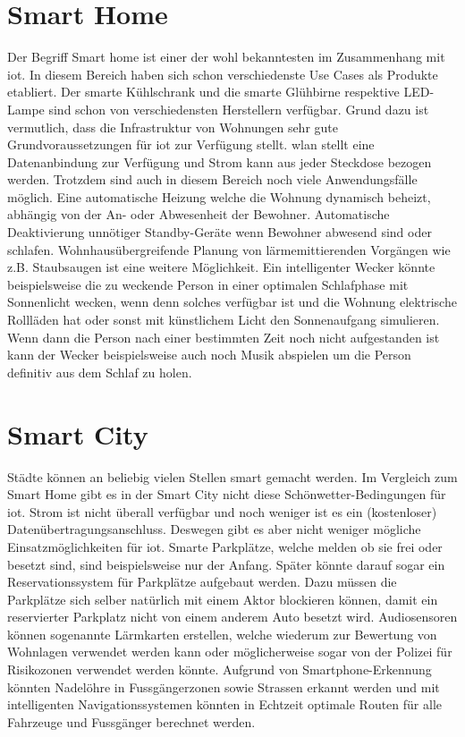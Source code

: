 \section{Smart Home}
Der Begriff \glqq{}Smart home\grqq{} ist einer der wohl bekanntesten im Zusammenhang mit \gls{iot}. In diesem Bereich haben sich schon verschiedenste Use Cases als Produkte etabliert. Der smarte Kühlschrank und die smarte Glühbirne respektive LED-Lampe sind schon von verschiedensten Herstellern verfügbar. Grund dazu ist vermutlich, dass die Infrastruktur von Wohnungen sehr gute Grundvoraussetzungen für \gls{iot} zur Verfügung stellt. \gls{wlan} stellt eine Datenanbindung zur Verfügung und Strom kann aus jeder Steckdose bezogen werden. Trotzdem sind auch in diesem Bereich noch viele Anwendungsfälle möglich. Eine automatische Heizung welche die Wohnung dynamisch beheizt, abhängig von der An- oder Abwesenheit der Bewohner. Automatische Deaktivierung unnötiger Standby-Geräte wenn Bewohner abwesend sind oder schlafen. Wohnhausübergreifende Planung von lärmemittierenden Vorgängen wie z.B. Staubsaugen ist eine weitere Möglichkeit. Ein intelligenter Wecker könnte beispielsweise die zu weckende Person in einer optimalen Schlafphase mit Sonnenlicht wecken, wenn denn solches verfügbar ist und die Wohnung elektrische Rollläden hat oder sonst mit künstlichem Licht den Sonnenaufgang simulieren. Wenn dann die Person nach einer bestimmten Zeit noch nicht aufgestanden ist kann der Wecker beispielsweise auch noch Musik abspielen um die Person definitiv aus dem Schlaf zu holen.

\section{Smart City}
Städte können an beliebig vielen Stellen \glqq{}smart\grqq{} gemacht werden. Im Vergleich zum Smart Home gibt es in der Smart City nicht diese Schönwetter-Bedingungen für \gls{iot}. Strom ist nicht überall verfügbar und noch weniger ist es ein (kostenloser) Datenübertragungsanschluss. Deswegen gibt es aber nicht weniger mögliche Einsatzmöglichkeiten für \gls{iot}. Smarte Parkplätze, welche melden ob sie frei oder besetzt sind, sind beispielsweise nur der Anfang. Später könnte darauf sogar ein Reservationssystem für Parkplätze aufgebaut werden. Dazu müssen die Parkplätze sich selber natürlich mit einem Aktor blockieren können, damit ein reservierter Parkplatz nicht von einem anderem Auto besetzt wird. Audiosensoren können sogenannte Lärmkarten erstellen, welche wiederum zur Bewertung von Wohnlagen verwendet werden kann oder möglicherweise sogar von der Polizei für Risikozonen verwendet werden könnte. Aufgrund von Smartphone-Erkennung könnten Nadelöhre in Fussgängerzonen sowie Strassen erkannt werden und mit intelligenten Navigationssystemen könnten in Echtzeit optimale Routen für alle Fahrzeuge und Fussgänger berechnet werden.
\iffalse
